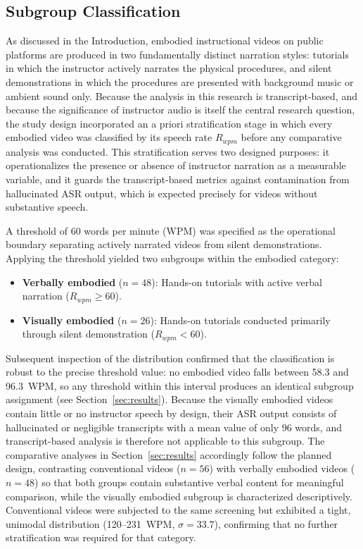 \documentclass[fleqn,10pt]{JLA_article} %
\begin{document}
\subsection{Subgroup Classification}
\label{sec:subgroup}

As discussed in the Introduction, embodied instructional videos on public platforms are produced in two fundamentally distinct narration styles: tutorials in which the instructor actively narrates the physical procedures, and silent demonstrations in which the procedures are presented with background music or ambient sound only. Because the analysis in this research is transcript-based, and because the significance of instructor audio is itself the central research question, the study design incorporated an a priori stratification stage in which every embodied video was classified by its speech rate $R_{wpm}$ before any comparative analysis was conducted. This stratification serves two designed purposes: it operationalizes the presence or absence of instructor narration as a measurable variable, and it guards the transcript-based metrics against contamination from hallucinated ASR output, which is expected precisely for videos without substantive speech.

A threshold of 60 words per minute (WPM) was specified as the operational boundary separating actively narrated videos from silent demonstrations. Applying the threshold yielded two subgroups within the embodied category:
\begin{itemize}[noitemsep]
    \item \textbf{Verbally embodied} ($n = 48$): Hands-on tutorials with active verbal narration ($R_{wpm} \geq 60$).
    \item \textbf{Visually embodied} ($n = 26$): Hands-on tutorials conducted primarily through silent demonstration ($R_{wpm} < 60$).
\end{itemize}

Subsequent inspection of the distribution confirmed that the classification is robust to the precise threshold value: no embodied video falls between 58.3 and 96.3~WPM, so any threshold within this interval produces an identical subgroup assignment (see Section~\ref{sec:results}). Because the visually embodied videos contain little or no instructor speech by design, their ASR output consists of hallucinated or negligible transcripts with a mean value of only 96 words, and transcript-based analysis is therefore not applicable to this subgroup. The comparative analyses in Section~\ref{sec:results} accordingly follow the planned design, contrasting conventional videos ($n = 56$) with verbally embodied videos ($n = 48$) so that both groups contain substantive verbal content for meaningful comparison, while the visually embodied subgroup is characterized descriptively. Conventional videos were subjected to the same screening but exhibited a tight, unimodal distribution (120--231~WPM, $\sigma = 33.7$), confirming that no further stratification was required for that category.
\end{document}
